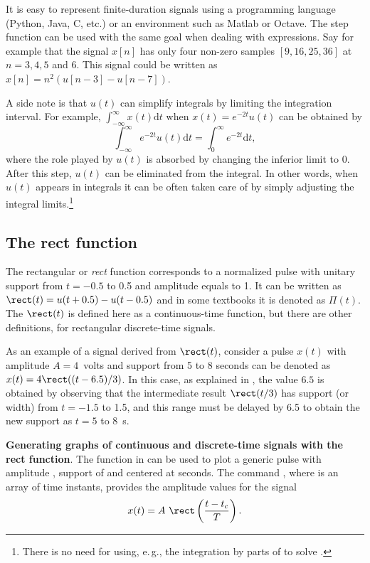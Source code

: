 It is easy to represent finite-duration signals using a programming language (Python, Java, C, etc.) or an environment such as Matlab or Octave. The step function can be used with the same goal when dealing with expressions.
Say for example that the signal $x[n]$ has only four non-zero samples $[9, 16, 25, 36]$ at $n=3,4,5$ and 6. This signal could be written as $x[n]=n^2(u[n-3] - u[n-7])$.

A side note is that $u(t)$ can simplify integrals by limiting the integration interval.
For example, $\int_{- \infty}^\infty {x(t)\textrm{d}t}$ when $x(t)=e^{-2t}u(t)$ can be obtained by
\begin{equation}
\int_{- \infty}^\infty{e^{-2t}u(t)\textrm{d}t} = \int_{0}^\infty{e^{-2t}\textrm{d}t},
\label{eq:stepExample}
\end{equation}
where the role played by $u(t)$ is absorbed by changing the inferior limit to 0. After this step, $u(t)$ can be eliminated from the integral. In other words, when $u(t)$ appears in integrals it can be often taken care of by simply adjusting the integral limits.\footnote{There is no need for using, e.\,g., the integration by parts of  to solve .}

\subsection{The rect function}
\label{sec:rect_function}

The rectangular or \emph{rect} function corresponds to a normalized pulse 
 with unitary support from $t=-0.5$ to 0.5 and amplitude equals to 1. It can be written as $\rect(t) = u(t+0.5) - u(t-0.5)$ and in some textbooks it is denoted as $\Pi(t)$. The $\rect(t)$ is defined here as a continuous-time function, but there are
other definitions, for rectangular discrete-time signals.

As an example of a signal derived from $\rect(t)$, consider a pulse $x(t)$ with amplitude $A=4$~volts and support from 5 to 8 seconds can be denoted as $x(t) = 4\rect( (t-6.5)/3)$. In this case, as explained in , the value $6.5$ is obtained by observing that the intermediate result $\rect(t/3)$ has support (or width) from $t=-1.5$ to 1.5,
 and this range must be delayed by 6.5 to obtain the new support as $t=5$ to 8~s.

\bExample \textbf{Generating graphs of continuous and discrete-time signals with the rect function}.
The function  in {\matlab} can be used to plot a generic pulse with amplitude , support of  and centered at  seconds. The command , where  is an array of time instants, provides the amplitude values for the signal
\[
x(t) = A \textrm{~} \rect \left( \frac{t-t_c}{T} \right).
\]

